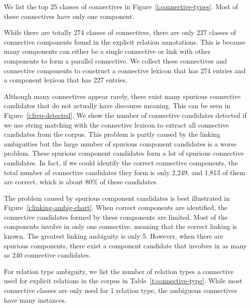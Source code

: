 




We list the top 25 classes of connectives in Figure~\ref{i:connective-types}.
Most of these connectives have only one component.



While there are totally 274 classes of connectives, there are only 227 classes
of connective components found in the explicit relation annotations. This
is because many components can either be a single connective or link
with other components to form a parallel connective. We collect these
connectives and connective components to construct a connective lexicon
that has 274 entries and a component lexicon that has 227 entries.


Although many connectives appear rarely, there exist many spurious connective
candidates that do not actually have discourse meaning. This can be seen in
Figure~\ref{i:freq-detected}. We show the number of connective candidates
detected if we use string matching with the connective lexicon to extract
all connective candidates from the corpus. This problem is partly caused by the linking
ambiguities but the large number of spurious component candidates is a worse problem.
These spurious component candidates form a lot of spurious connective candidates.
In fact, if we could identify the correct
connective components, the total number of connective candidates they form
is only 2,249, and 1,813 of them are correct, which is about 80\% of these candidates.



The problem caused by spurious component candidates is best illustrated in
Figure~\ref{i:linking-ambig-chart}. When correct components are identified,
the connective candidates formed by these components are limited.
Most of the components involve in only one connective, meaning that the correct linking
is known. The greatest linking ambiguity is only 5. However, when there are
spurious components, there exist a component candidate that involves in as many
as 240 connective candidates.



For relation type ambiguity, we list the number of relation types a
connective used for explicit relations in the corpus in Table~\ref{t:connective-type}.
While most connective classes are only used for 1 relation type,
the ambiguous connectives have many instances.

